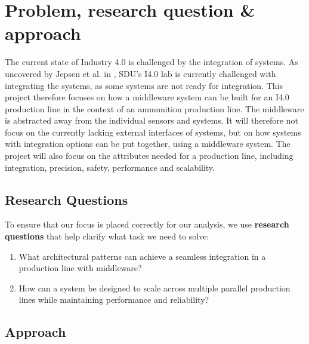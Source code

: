 \section{Problem, research question \& approach} %
\label{sec:problem-research-question-approach}

The current state of Industry 4.0 is challenged by the integration of systems. As uncovered by Jepsen et al. in \cite{Jepsen2020}, SDU's I4.0 lab is currently challenged with integrating the systems, as some systems are not ready for integration. This project therefore focuses on how a middleware system can be built for an I4.0 production line in the context of an ammunition production line. The middleware is abstracted away from the individual sensors and systems. It will therefore not focus on the currently lacking external interfaces of systems, but on how systems with integration options can be put together, using a middleware system. The project will also focus on the attributes needed for a production line, including integration, precision, safety, performance and scalability.

\subsection{Research Questions} \label{sec:research-question}
To ensure that our focus is placed correctly for our analysis, we use \textbf{research questions} that help clarify what task we need to solve:
\begin{enumerate}
    \item What architectural patterns can achieve a seamless integration in a production line with middleware?
    \item How can a system be designed to scale across multiple parallel production lines while maintaining performance and reliability?
\end{enumerate}



\subsection{Approach}

